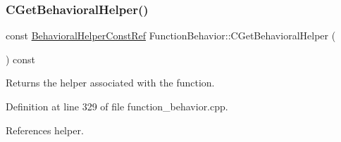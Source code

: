 \subsubsection{\texorpdfstring{C\+Get\+Behavioral\+Helper()}{CGetBehavioralHelper()}}
{\footnotesize\ttfamily const \hyperlink{behavioral__helper_8hpp_aae973b54cac87eef3b27442aa3e1e425}{Behavioral\+Helper\+Const\+Ref} Function\+Behavior\+::\+C\+Get\+Behavioral\+Helper (\begin{DoxyParamCaption}{ }\end{DoxyParamCaption}) const}



Returns the helper associated with the function. 



Definition at line 329 of file function\+\_\+behavior.\+cpp.



References helper.



